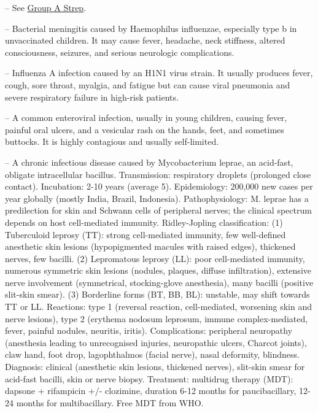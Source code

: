 -- See \hyperlink{Group A Strep}{Group A Strep}.

-- Bacterial meningitis caused by Haemophilus influenzae, especially type b in unvaccinated children. It may cause fever, headache, neck stiffness, altered consciousness, seizures, and serious neurologic complications.

-- Influenza A infection caused by an H1N1 virus strain. It usually produces fever, cough, sore throat, myalgia, and fatigue but can cause viral pneumonia and severe respiratory failure in high-risk patients.

-- A common enteroviral infection, usually in young children, causing fever, painful oral ulcers, and a vesicular rash on the hands, feet, and sometimes buttocks. It is highly contagious and usually self-limited.

-- A chronic infectious disease caused by Mycobacterium leprae, an acid-fast, obligate intracellular bacillus. Transmission: respiratory droplets (prolonged close contact). Incubation: 2-10 years (average 5). Epidemiology: 200,000 new cases per year globally (mostly India, Brazil, Indonesia). Pathophysiology: M. leprae has a predilection for skin and Schwann cells of peripheral nerves; the clinical spectrum depends on host cell-mediated immunity. Ridley-Jopling classification: (1) Tuberculoid leprosy (TT): strong cell-mediated immunity, few well-defined anesthetic skin lesions (hypopigmented macules with raised edges), thickened nerves, few bacilli. (2) Lepromatous leprosy (LL): poor cell-mediated immunity, numerous symmetric skin lesions (nodules, plaques, diffuse infiltration), extensive nerve involvement (symmetrical, stocking-glove anesthesia), many bacilli (positive slit-skin smear). (3) Borderline forms (BT, BB, BL): unstable, may shift towards TT or LL. Reactions: type 1 (reversal reaction, cell-mediated, worsening skin and nerve lesions), type 2 (erythema nodosum leprosum, immune complex-mediated, fever, painful nodules, neuritis, iritis). Complications: peripheral neuropathy (anesthesia leading to unrecognised injuries, neuropathic ulcers, Charcot joints), claw hand, foot drop, lagophthalmos (facial nerve), nasal deformity, blindness. Diagnosis: clinical (anesthetic skin lesions, thickened nerves), slit-skin smear for acid-fast bacilli, skin or nerve biopsy. Treatment: multidrug therapy (MDT): dapsone + rifampicin +/- clozimine, duration 6-12 months for paucibacillary, 12-24 months for multibacillary. Free MDT from WHO.

